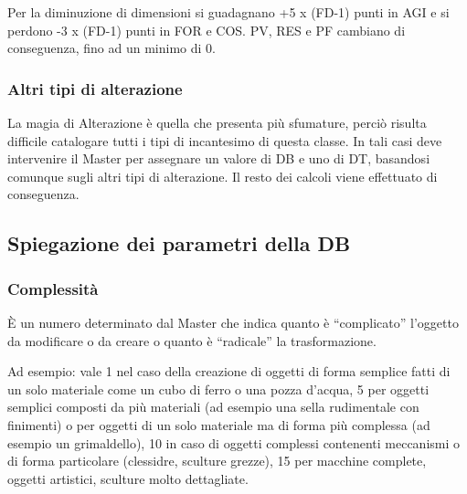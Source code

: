 Per la diminuzione di dimensioni si guadagnano +5 x (FD-1) punti in
AGI e si perdono -3 x (FD-1) punti in FOR e COS. PV, RES e PF cambiano
di conseguenza, fino ad un minimo di 0. 



\subsubsection{Altri tipi di alterazione} 

La magia di Alterazione \`e quella che presenta
pi\`u sfumature, perci\`o risulta difficile catalogare tutti i
tipi di incantesimo di questa classe. In tali casi deve intervenire il
Master per assegnare un valore di DB e uno di DT, basandosi comunque
sugli altri tipi di alterazione. Il resto dei calcoli viene effettuato
di conseguenza. 

{\raggedright \subsection{Spiegazione dei parametri della DB}}
\subsubsection{Complessit\`a}

\`E un numero determinato dal Master che indica quanto \`e
``complicato'' l'oggetto da modificare o da creare o quanto \`e
``radicale'' la trasformazione.

Ad esempio: vale 1 nel caso della creazione di oggetti di forma
semplice fatti di un solo materiale come un cubo di ferro o una pozza
d'acqua, 5 per oggetti semplici composti da pi\`u materiali (ad
esempio una sella rudimentale con finimenti) o per oggetti di un solo
materiale ma di forma pi\`u complessa (ad esempio un grimaldello),
10 in caso di oggetti complessi contenenti meccanismi o di forma
particolare (clessidre, sculture grezze), 15 per macchine complete,
oggetti artistici, sculture molto dettagliate.

